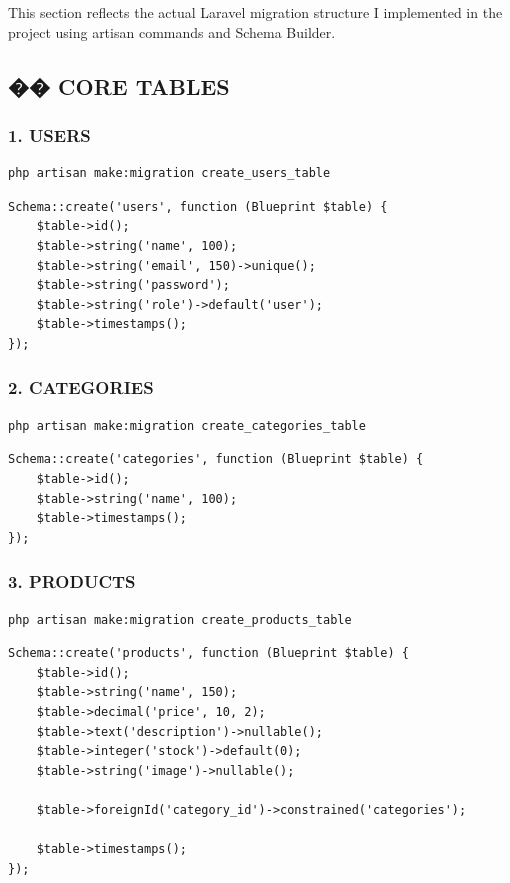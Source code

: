 \documentclass[12pt,a4paper]{article}
\begin{document}
This section reflects the actual Laravel migration structure I implemented in the project using artisan commands and Schema Builder.

\subsection{�� CORE TABLES}

\subsubsection{1. USERS}
\begin{verbatim}
php artisan make:migration create_users_table
\end{verbatim}

\begin{verbatim}
Schema::create('users', function (Blueprint $table) {
    $table->id();
    $table->string('name', 100);
    $table->string('email', 150)->unique();
    $table->string('password');
    $table->string('role')->default('user');
    $table->timestamps();
});
\end{verbatim}

\subsubsection{2. CATEGORIES}
\begin{verbatim}
php artisan make:migration create_categories_table
\end{verbatim}

\begin{verbatim}
Schema::create('categories', function (Blueprint $table) {
    $table->id();
    $table->string('name', 100);
    $table->timestamps();
});
\end{verbatim}

\subsubsection{3. PRODUCTS}
\begin{verbatim}
php artisan make:migration create_products_table
\end{verbatim}

\begin{verbatim}
Schema::create('products', function (Blueprint $table) {
    $table->id();
    $table->string('name', 150);
    $table->decimal('price', 10, 2);
    $table->text('description')->nullable();
    $table->integer('stock')->default(0);
    $table->string('image')->nullable();

    $table->foreignId('category_id')->constrained('categories');

    $table->timestamps();
});
\end{verbatim}
\end{document}
